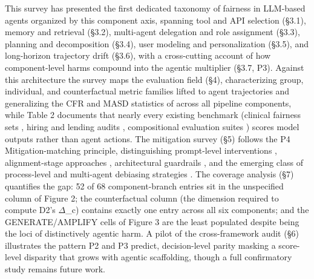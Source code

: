 \documentclass[10pt]{article}
\begin{document}
This survey has presented the first dedicated taxonomy of fairness in LLM-based agents organized by this component axis, spanning tool and API selection (\S{}3.1), memory and retrieval (\S{}3.2), multi-agent delegation and role assignment (\S{}3.3), planning and decomposition (\S{}3.4), user modeling and personalization (\S{}3.5), and long-horizon trajectory drift (\S{}3.6), with a cross-cutting account of how component-level harms compound into the agentic multiplier (\S{}3.7, P3). Against this architecture the survey maps the evaluation field (\S{}4), characterizing group, individual, and counterfactual metric families lifted to agent trajectories and generalizing the CFR and MASD statistics of \cite{mayilvaghanan2026counterfactual} across all pipeline components, while Table 2 documents that nearly every existing benchmark (clinical fairness sets \cite{xiao2025fairmedqa,adappanavar2025mfarm,ghosh2025medequalqa}, hiring and lending audits \cite{an2025measuring,azime2025accept}, compositional evaluation suites \cite{wang2024ceb}) scores model outputs rather than agent actions. The mitigation survey (\S{}5) follows the P4 Mitigation-matching principle, distinguishing prompt-level interventions \cite{furniturewala2024thinking,li2024prompting}, alignment-stage approaches \cite{allam2024biasdpo,bai2022constitutional}, architectural guardrails \cite{dong2024building}, and the emerging class of process-level and multi-agent debiasing strategies \cite{owens2024multi,choi2025identity,ki2025multiple}. The coverage analysis (\S{}7) quantifies the gap: 52 of 68 component-branch entries sit in the unspecified column of Figure 2; the counterfactual column (the dimension required to compute D2's $\Delta$\_c) contains exactly one entry across all six components; and the GENERATE/AMPLIFY cells of Figure 3 are the least populated despite being the loci of distinctively agentic harm. A pilot of the cross-framework audit (\S{}6) illustrates the pattern P2 and P3 predict, decision-level parity masking a score-level disparity that grows with agentic scaffolding, though a full confirmatory study remains future work.
\end{document}

